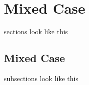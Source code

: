 

\section{Mixed Case} 
sections look like this 

\subsection{Mixed Case}
subsections look like this



